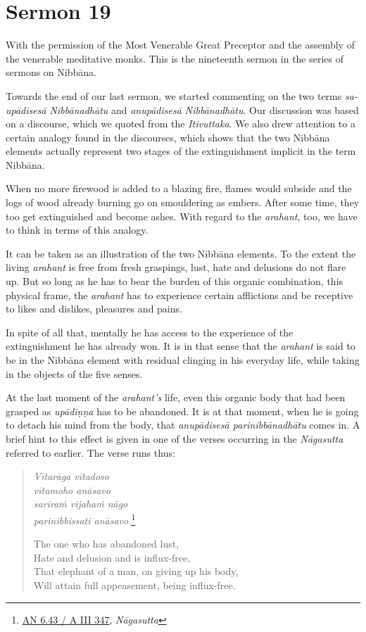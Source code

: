 \chapter{Sermon 19}

\NibbanaOpeningQuote

With the permission of the Most Venerable Great Preceptor and the assembly of the venerable meditative monks. This is the nineteenth sermon in the series of sermons on Nibbāna.

Towards the end of our last sermon, we started commenting on the two terms \emph{sa-upādisesā Nibbānadhātu} and \emph{anupādisesā Nibbānadhātu}. Our discussion was based on a discourse, which we quoted from the \emph{Itivuttaka}. We also drew attention to a certain analogy found in the discourses, which shows that the two Nibbāna elements actually represent two stages of the extinguishment implicit in the term Nibbāna.

When no more firewood is added to a blazing fire, flames would subside and the logs of wood already burning go on smouldering as embers. After some time, they too get extinguished and become ashes. With regard to the \emph{arahant}, too, we have to think in terms of this analogy.

It can be taken as an illustration of the two Nibbāna elements. To the extent the living \emph{arahant} is free from fresh graspings, lust, hate and delusions do not flare up. But so long as he has to bear the burden of this organic combination, this physical frame, the \emph{arahant} has to experience certain afflictions and be receptive to likes and dislikes, pleasures and pains.

In spite of all that, mentally he has access to the experience of the extinguishment he has already won. It is in that sense that the \emph{arahant} is said to be in the Nibbāna element with residual clinging in his everyday life, while taking in the objects of the five senses.

At the last moment of the \emph{arahant's} life, even this organic body that had been grasped as \emph{upādiṇṇa} has to be abandoned. It is at that moment, when he is going to detach his mind from the body, that \emph{anupādisesā parinibbānadhātu} comes in. A brief hint to this effect is given in one of the verses occurring in the \emph{Nāgasutta} referred to earlier. The verse runs thus:

\begin{quote}
\emph{Vītarāga vītadoso}\\
\emph{vītamoho anāsavo}\\
\emph{sarīraṁ vijahaṁ nāgo}\\
\emph{parinibbissati anāsavo.}\footnote{\href{https://suttacentral.net/an6.43/pli/ms}{AN 6.43 / A III 347}, \emph{Nāgasutta}}

The one who has abandoned lust,\\
Hate and delusion and is influx-free,\\
That elephant of a man, on giving up his body,\\
Will attain full appeasement, being influx-free.
\end{quote}

